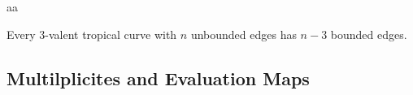 \begin{definition}
    aa
\end{definition}

\begin{definition}
    
\end{definition}

\begin{definition}
    
\end{definition}

\begin{definition}
    
\end{definition}

\begin{proposition}
    
\end{proposition}

\begin{definition}
    
\end{definition}

\begin{lemma}
    
\end{lemma}

\begin{lemma}
    Every $3$-valent tropical curve with $n$ unbounded edges has $n-3$ bounded edges.
\end{lemma}

\begin{remark}
    
\end{remark}

\subsection{Multilplicites and Evaluation Maps}

\begin{definition}
    
\end{definition}

\begin{definition}
    
\end{definition}

